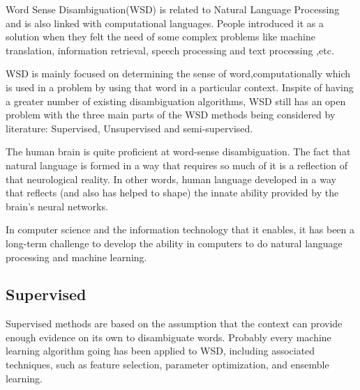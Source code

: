 Word Sense Disambiguation(WSD) is related to Natural Language Processing and is also linked with computational languages. 
People introduced it as a solution when they felt the need of some complex problems like machine translation, information retrieval, speech processing and text processing ,etc. 

WSD is mainly focused on determining the sense of word,computationally which is used in a problem by using that word in a particular context. 
Inspite of having a greater number of existing disambiguation algorithms, WSD still has an open problem with the three main parts of the WSD methods being considered by literature: Supervised, Unsupervised and semi-supervised. 

The human brain is quite proficient at word-sense disambiguation. 
The fact that natural language is formed in a way that requires so much of it is a reflection of that neurological reality. 
In other words, human language developed in a way that reflects (and also has helped to shape) the innate ability provided 
by the brain's neural networks. 

In computer science and the information technology that it enables, it has been a long-term challenge to develop the ability 
in computers to do natural language processing and machine learning. 

\subsection*{Supervised}

Supervised methods are based on the assumption that the context can provide enough evidence on its own to disambiguate words. 
Probably every machine learning algorithm going has been applied to WSD, including associated techniques, such as feature selection, parameter optimization, and ensemble learning.

